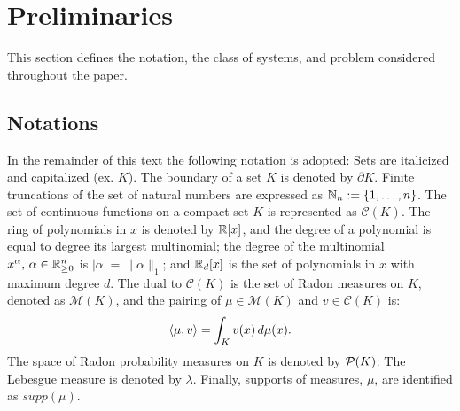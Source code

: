   \section{Preliminaries}
\label{sec:preliminaries}
  This section defines the notation, the class of systems, and problem considered throughout the paper.

  \subsection{Notations}
  In the remainder of this text the following notation is adopted: 
Sets are italicized and capitalized (ex. $K$). 
The boundary of a set $K$ is denoted by $\partial K$.
Finite truncations of the set of natural numbers are expressed as \mbox{$\mathbb{N}_n:=\{1,\ldots,n\}$}. 
The set of continuous functions on a compact set $K$ is represented as $\mathcal C(K)$. 
The ring of polynomials in $x$ is denoted by $\mathbb{R}[x]$, and the degree of a polynomial is equal to degree its largest multinomial; the degree of the multinomial $x^\alpha,\,\alpha\in \mathbb{R}_{\ge 0}^n$ is $|\alpha|=\|\alpha\|_1$; and $\mathbb{R}_d[x]$ is the set of polynomials in $x$ with maximum degree $d$. 
The dual to $\mathcal C(K)$ is the set of Radon measures on $K$, denoted as $\mathcal M(K)$, and the pairing of $\mu\in \mathcal M(K)$ and $v\in \mathcal C(K)$ is:
  \begin{align}
  \left\langle \mu,v\right\rangle=\int_{K}v(x)\,d\mu(x).
  \end{align}
The space of Radon probability measures on $K$ is denoted by ${\cal P}(K)$.
The Lebesgue measure is denoted by $\lambda$. 
Finally, supports of measures, $\mu$, are identified as $supp(\mu)$.


